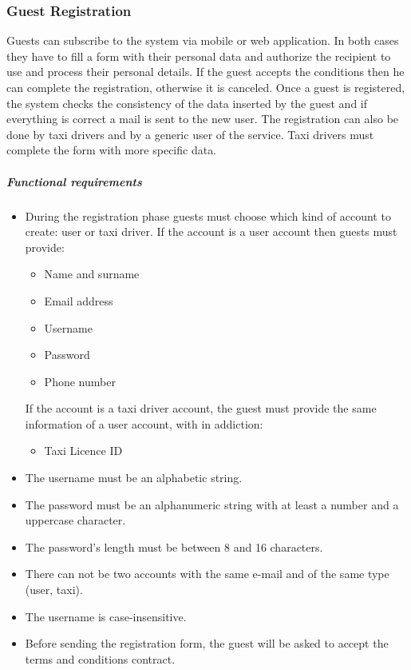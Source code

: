 \subsubsection{Guest Registration}
Guests can subscribe to the system via mobile or web application. In both cases they have to fill a form with their personal data and authorize the recipient to use and process their personal details.
If the guest accepts the conditions then he can complete the registration, otherwise it is canceled.
Once a guest is registered, the system checks the consistency of the data inserted by the guest and if everything is correct a mail is sent to the new user. \newline
The registration can also be done by taxi drivers and by a generic user of the service. Taxi drivers must complete the form with more specific data.

	\subparagraph{Functional requirements}
	\noindent
		\begin{itemize}
			\item  During the registration phase guests must choose which kind of account to create: user or taxi driver.
			If the account is a user account then guests must provide:
			\begin{itemize}
				\item Name and surname
				\item Email address
				\item Username
				\item Password
				\item Phone number
			\end{itemize}
			If the account is a taxi driver account, the guest must provide the same information of a user account, with in addiction:
			\begin{itemize}
				\item Taxi Licence ID
			\end{itemize}
			\item The username must be an alphabetic string.
			\item The password must be an alphanumeric string with at least a number and a uppercase character.
			\item The password's length must be between 8 and 16 characters.
			\item There can not be two accounts with the same e-mail and of the same type (user, taxi).
			\item The username is case-insensitive.
			\item Before sending the registration form, the guest will be asked to accept the terms and conditions contract.
		\end{itemize}


